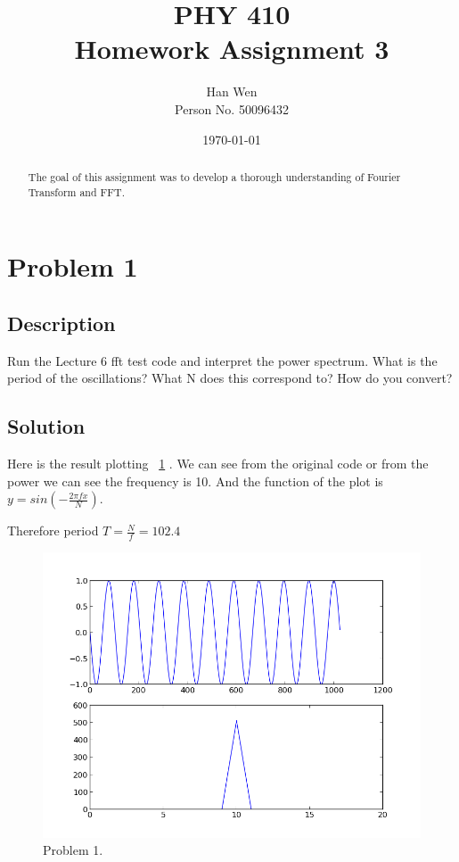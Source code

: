 \documentclass[11pt,letterpaper]{article}
\begin{document}
\title{PHY 410 \\ Homework Assignment 3}
\author{Han Wen \\ \tiny Person No. 50096432}
\date{\today}

\maketitle

\begin{abstract}
The goal of this assignment was to develop a thorough understanding of Fourier Transform and FFT.
\end{abstract}

\tableofcontents

\newpage
\section{Problem 1}

\subsection{Description}
Run the Lecture 6 fft test code and interpret the power spectrum. What is the period of the oscillations? What N does this correspond to? How do you convert? 




\subsection{Solution}
Here is the result plotting ~\ref{figure1} . We can see from the original code or from the power we can see the frequency is 10. And the function of the plot is 
$y=sin(-\frac{2\pi fx}{N})$.

Therefore period $T=\frac{N}{f}=102.4$

 
\begin{figure}
\begin{center}
\includegraphics[width=0.9\linewidth,angle=0]{p1.png}
\caption{Problem 1.}
\label{figure1}
\end{center}
\end{figure}
\end{document}
